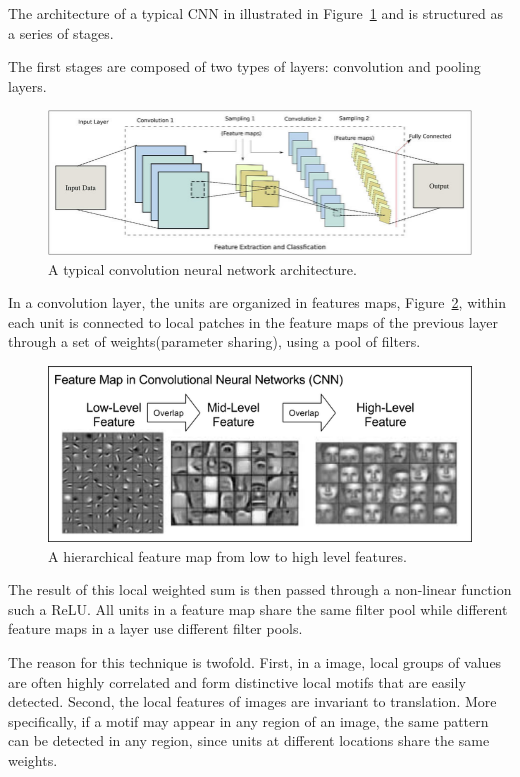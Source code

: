 The architecture of a typical CNN in illustrated in Figure~\ref{c3:fig_cnn} and is structured as a series of stages.

The first stages are composed of two types of layers: convolution and pooling layers.

\begin{figure}[h!]
    \centering  
    \includegraphics[width=.7\textwidth]{figures/chap3/cnn/cnn_sample}
    \caption{A typical convolution neural network architecture.}
    \label{c3:fig_cnn}
\end{figure}

In a convolution layer, the units are organized in features maps, Figure~\ref{c3:fig_feature_map}, within each unit is connected to local patches in the feature maps of the previous layer through a set of weights(parameter sharing), using a pool of filters. 

\begin{figure}[h!]
    \centering  
    \includegraphics[width=.7\textwidth]{figures/chap3/cnn/feature_map}
    \caption{A hierarchical feature map from low to high level features.}
    \label{c3:fig_feature_map}
\end{figure}

The result of this local weighted sum is then passed through a non-linear function such a ReLU. All units in a feature map share the same filter pool while different feature maps in a layer use different filter pools.

The reason for this technique is twofold.
First, in a image, local groups of values are often highly correlated and form distinctive local motifs that are easily detected.
Second, the local features of images are invariant to translation. More specifically, if a motif may appear in any region of an image, the same pattern can be detected in any region, since units at different locations share the same weights.

